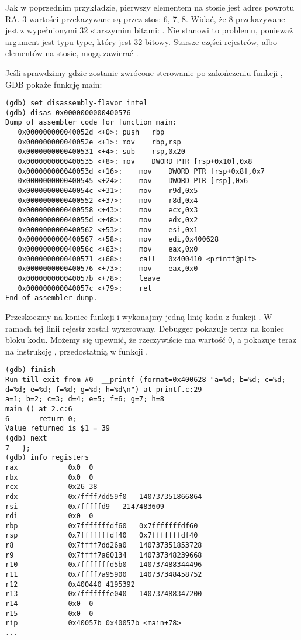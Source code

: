 Jak w poprzednim przykładzie, pierwszy elementem na stosie jest adres powrotu \ac{RA}.
3 wartości przekazywane są przez stos: 6, 7, 8.
Widać, że 8 przekazywane jest z wypełnionymi 32 starszymim bitami: .
Nie stanowi to problemu, ponieważ argument jest typu \Tint type, który jest 32-bitowy.
Starsze części rejestrów, albo elementów na stosie, mogą zawierać .

Jeśli sprawdzimy gdzie zostanie zwrócone sterowanie po zakończeniu funkcji \printf, \ac{GDB} pokaże funkcję main:

\begin{lstlisting}[style=customasmx86]
(gdb) set disassembly-flavor intel
(gdb) disas 0x0000000000400576
Dump of assembler code for function main:
   0x000000000040052d <+0>:	push   rbp
   0x000000000040052e <+1>:	mov    rbp,rsp
   0x0000000000400531 <+4>:	sub    rsp,0x20
   0x0000000000400535 <+8>:	mov    DWORD PTR [rsp+0x10],0x8
   0x000000000040053d <+16>:	mov    DWORD PTR [rsp+0x8],0x7
   0x0000000000400545 <+24>:	mov    DWORD PTR [rsp],0x6
   0x000000000040054c <+31>:	mov    r9d,0x5
   0x0000000000400552 <+37>:	mov    r8d,0x4
   0x0000000000400558 <+43>:	mov    ecx,0x3
   0x000000000040055d <+48>:	mov    edx,0x2
   0x0000000000400562 <+53>:	mov    esi,0x1
   0x0000000000400567 <+58>:	mov    edi,0x400628
   0x000000000040056c <+63>:	mov    eax,0x0
   0x0000000000400571 <+68>:	call   0x400410 <printf@plt>
   0x0000000000400576 <+73>:	mov    eax,0x0
   0x000000000040057b <+78>:	leave  
   0x000000000040057c <+79>:	ret    
End of assembler dump.
\end{lstlisting}

Przeskoczmy na koniec funkcji \printf i wykonajmy jedną linię kodu z funkcji \main. W ramach tej linii rejestr \EAX został wyzerowany. Debugger pokazuje teraz na koniec bloku kodu. Możemy się upewnić, że \EAX rzeczywiście ma wartość 0, a \RIP pokazuje teraz na instrukcję , przedostatnią w funkcji \main.

\begin{lstlisting}
(gdb) finish
Run till exit from #0  __printf (format=0x400628 "a=%d; b=%d; c=%d; d=%d; e=%d; f=%d; g=%d; h=%d\n") at printf.c:29
a=1; b=2; c=3; d=4; e=5; f=6; g=7; h=8
main () at 2.c:6
6		return 0;
Value returned is $1 = 39
(gdb) next
7	};
(gdb) info registers
rax            0x0	0
rbx            0x0	0
rcx            0x26	38
rdx            0x7ffff7dd59f0	140737351866864
rsi            0x7fffffd9	2147483609
rdi            0x0	0
rbp            0x7fffffffdf60	0x7fffffffdf60
rsp            0x7fffffffdf40	0x7fffffffdf40
r8             0x7ffff7dd26a0	140737351853728
r9             0x7ffff7a60134	140737348239668
r10            0x7fffffffd5b0	140737488344496
r11            0x7ffff7a95900	140737348458752
r12            0x400440	4195392
r13            0x7fffffffe040	140737488347200
r14            0x0	0
r15            0x0	0
rip            0x40057b	0x40057b <main+78>
...
\end{lstlisting}
